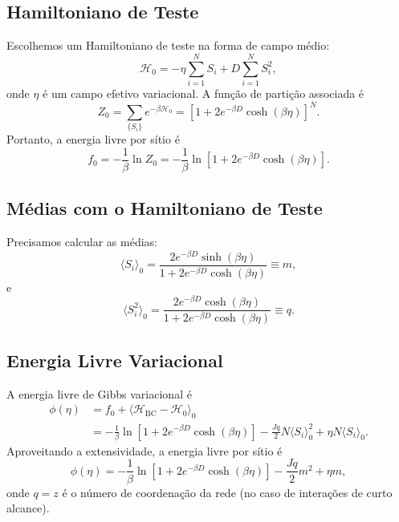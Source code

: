 \documentclass[12pt]{article}
\begin{document}
\subsection{Hamiltoniano de Teste}

Escolhemos um Hamiltoniano de teste na forma de campo médio:
\begin{equation}
    \mathcal{H}_0 = -\eta \sum_{i=1}^N S_i + D \sum_{i=1}^N S_i^2,
\end{equation}
onde $\eta$ é um campo efetivo variacional. A função de partição associada é
\begin{equation}
    Z_0 = \sum_{\{S_i\}} e^{-\beta \mathcal{H}_0} = \left[ 1 + 2 e^{-\beta D} \cosh(\beta \eta) \right]^N.
\end{equation}
Portanto, a energia livre por sítio é
\begin{equation}
    f_0 = -\frac{1}{\beta} \ln Z_0 = -\frac{1}{\beta} \ln\left[ 1 + 2 e^{-\beta D} \cosh(\beta \eta) \right].
\end{equation}

\subsection{Médias com o Hamiltoniano de Teste}

Precisamos calcular as médias:
\begin{equation}
    \langle S_i \rangle_0 = \frac{2 e^{-\beta D} \sinh(\beta \eta)}{1 + 2 e^{-\beta D} \cosh(\beta \eta)} \equiv m,
\end{equation}
e
\begin{equation}
    \langle S_i^2 \rangle_0 = \frac{2 e^{-\beta D} \cosh(\beta \eta)}{1 + 2 e^{-\beta D} \cosh(\beta \eta)} \equiv q.
\end{equation}

\subsection{Energia Livre Variacional}

A energia livre de Gibbs variacional é
\begin{align}
    \phi(\eta) &= f_0 + \langle \mathcal{H}_{\text{BC}} - \mathcal{H}_0 \rangle_0 \\
    &= -\frac{1}{\beta} \ln\left[ 1 + 2 e^{-\beta D} \cosh(\beta \eta) \right] 
    - \frac{J q}{2} N \langle S_i \rangle_0^2 + \eta N \langle S_i \rangle_0.
\end{align}
Aproveitando a extensividade, a energia livre por sítio é
\begin{equation}
    \phi(\eta) = -\frac{1}{\beta} \ln\left[ 1 + 2 e^{-\beta D} \cosh(\beta \eta) \right]
    - \frac{J q}{2} m^2 + \eta m,
\end{equation}
onde $q = z$ é o número de coordenação da rede (no caso de interações de curto alcance).
\end{document}
